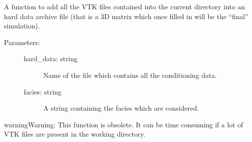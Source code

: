 \documentclass[letterpaper,10pt,english]{sphinxmanual}
\begin{document}
\begin{fulllineitems}
\label{\detokenize{appendices:s2Dcd.s2Dcd.addVtk2HdArchive}}
A function to add all the VTK files contained into the current
directory into an hard data archive file (that is a 3D matrix
which once filled in will be the “final” simulation).
\begin{description}
\item[{Parameters:}] \leavevmode\begin{description}
\item[{hard\_data: string}] \leavevmode
Name of the file which contains all the conditioning data.

\item[{facies: string}] \leavevmode
A string containing the facies which are considered.

\end{description}

\end{description}

\begin{sphinxadmonition}{warning}{Warning:}
This function is obsolete. It can be time consuming if a lot
of VTK files are present in the working directory.
\end{sphinxadmonition}

\end{fulllineitems}

\end{document}
